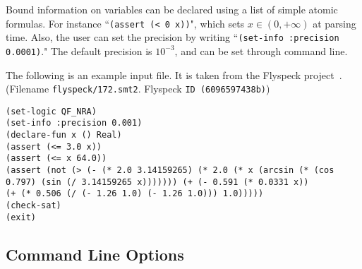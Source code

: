\documentclass[envcountsect]{llncs}
\begin{document}
Bound information on variables can be declared using a list of simple atomic formulas. For instance ``{\tt (assert (< 0 x))}", which sets $x\in (0, +\infty)$ at parsing time. Also, the user can set the precision by writing
``{\tt (set-info :precision 0.0001)}." The default precision is $10^{-3}$, and can be set through command line.
\begin{example}\label{example} The following is an example input file.
It is taken from the Flyspeck project~\cite{DBLP:conf/dagstuhl/Hales05}. (Filename {\tt flyspeck/172.smt2}. Flyspeck {\tt ID (6096597438b)})
 \begin{verbatim}
(set-logic QF_NRA)
(set-info :precision 0.001)
(declare-fun x () Real)
(assert (<= 3.0 x))
(assert (<= x 64.0))
(assert (not (> (- (* 2.0 3.14159265) (* 2.0 (* x (arcsin (* (cos
0.797) (sin (/ 3.14159265 x))))))) (+ (- 0.591 (* 0.0331 x))
(+ (* 0.506 (/ (- 1.26 1.0) (- 1.26 1.0))) 1.0)))))
(check-sat)
(exit)
\end{verbatim}
\end{example}

\subsection{Command Line Options}
\end{document}
